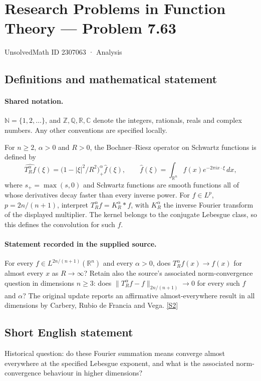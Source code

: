 \documentclass[11pt]{article}
\newcommand{\sref}[2]{\hyperlink{source:#1:#2}{[S#2]}}
\begin{document}
\setcounter{section}{2307062}
\section{Research Problems in Function Theory — Problem 7.63}\label{2307063}
{\small\sffamily UnsolvedMath ID 2307063 · Analysis}
\subsection{Definitions and mathematical statement}

\paragraph{Shared notation.}$\mathbb N=\{1,2,\ldots\}$, and $\mathbb Z,\mathbb Q,\mathbb R,\mathbb C$ denote the integers, rationals, reals and complex numbers. Any other conventions are specified locally.


For $n\ge2$, $\alpha>0$ and $R>0$, the Bochner--Riesz operator on Schwartz functions is defined by
\[\widehat{T_R^\alpha f}(\xi)=\big(1-|\xi|^2/R^2\big)_+^\alpha\hat f(\xi),
\qquad\hat f(\xi)=\int_{\mathbb R^n}f(x)e^{-2\pi i x\cdot\xi}\,dx,
\]
where $s_+=\max(s,0)$ and Schwartz functions are smooth functions all of whose derivatives decay faster than every inverse power. For $f\in L^p$, $p=2n/(n+1)$, interpret $T_R^\alpha f=K_R^\alpha*f$, with $K_R^\alpha$ the inverse Fourier transform of the displayed multiplier. The kernel belongs to the conjugate Lebesgue class, so this defines the convolution for such $f$.
\paragraph{Statement recorded in the supplied source.}
For every $f\in L^{2n/(n+1)}(\mathbb R^n)$ and every $\alpha>0$, does $T_R^\alpha f(x)\to f(x)$ for almost every $x$ as $R\to\infty$? Retain also the source's associated norm-convergence question in dimensions $n\ge3$: does $\|T_R^\alpha f-f\|_{2n/(n+1)}\to0$ for every such $f$ and $\alpha$? The original update reports an affirmative almost-everywhere result in all dimensions by Carbery, Rubio de Francia and Vega. \sref{2307063}{2}
\subsection{Short English statement}
Historical question: do these Fourier summation means converge almost everywhere at the specified Lebesgue exponent, and what is the associated norm-convergence behaviour in higher dimensions?
\end{document}

